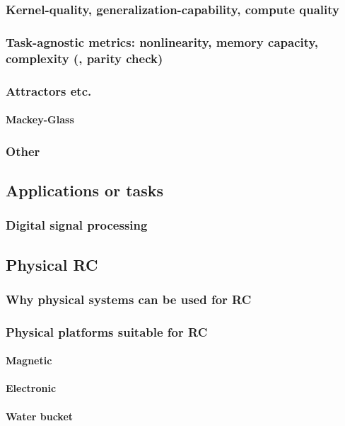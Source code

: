 \subsubsection{Kernel-quality, generalization-capability, compute quality}
\subsubsection{Task-agnostic metrics: nonlinearity, memory capacity, complexity (, parity check)}
\subsubsection{Attractors etc.} %
\paragraph{Mackey-Glass}
\subsubsection{Other} %
\subsection{Applications or tasks}
\subsubsection{Digital signal processing} %
\subsection{Physical RC}
\subsubsection{Why physical systems can be used for RC}
\subsubsection{Physical platforms suitable for RC}
\paragraph{Magnetic} %
\paragraph{Electronic}
\paragraph{Water bucket}

